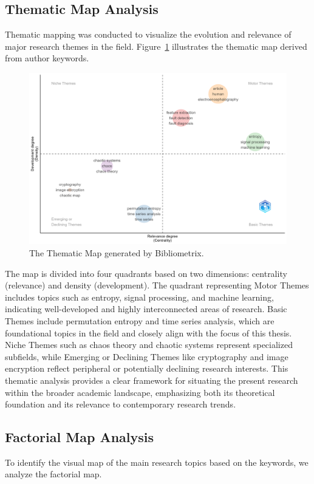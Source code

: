 \subsection{Thematic Map Analysis}

Thematic mapping was conducted to visualize the evolution and relevance of major research themes in the field. 
Figure~\ref{fig:ThematicMap} illustrates the thematic map derived from author keywords.

\begin{figure}[H]
	\centering
	\includegraphics[width=\textwidth]{ThematicMap}
	\caption{The Thematic Map generated by Bibliometrix.}
	\label{fig:ThematicMap}
\end{figure}

The map is divided into four quadrants based on two dimensions: centrality (relevance) and density (development). The quadrant representing Motor Themes includes topics such as entropy, signal processing, and machine learning, indicating well-developed and highly interconnected areas of research. Basic Themes include permutation entropy and time series analysis, which are foundational topics in the field and closely align with the focus of this thesis. Niche Themes such as chaos theory and chaotic systems represent specialized subfields, while Emerging or Declining Themes like cryptography and image encryption reflect peripheral or potentially declining research interests. This thematic analysis provides a clear framework for situating the present research within the broader academic landscape, emphasizing both its theoretical foundation and its relevance to contemporary research trends.

\subsection{Factorial Map Analysis}
To identify the visual map of the main research topics based on the keywords, we analyze the factorial map.

